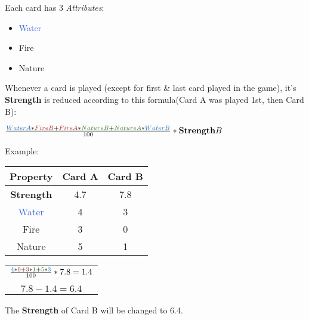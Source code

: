 \documentclass{article}
\begin{document}
    \begin{flushleft}
        Each card has 3 \textit{Attributes}: 
    \end{flushleft}
    
    \begin{itemize}
        \item \textcolor{RoyalBlue}{Water}
        \item \textcolor{BrickRed}{Fire}
        \item \textcolor{OliveGreen}{Nature}
    \end{itemize}
    
    \begin{flushleft}
        Whenever a card is played (except for first \& last card played in the game), it's \textbf{Strength} is reduced according to this formula(Card A was played 1st, then Card B):
    \end{flushleft}
    
    \begin{center}
        $\frac{\textcolor{RoyalBlue}{Water A} * \textcolor{BrickRed}{Fire B} + \textcolor{BrickRed}{Fire A} * \textcolor{OliveGreen}{Nature B} + 
        \textcolor{OliveGreen}{Nature A} * \textcolor{RoyalBlue}{Water B}}{100}*\textbf{Strength} B$
    \end{center}
    
    \begin{flushleft}
        Example: 
    \end{flushleft}
    
    \begin{center}
    \begin{tabular}{|c|c|c|}
    \hline
        Property & Card A & Card B  \\
    \hline
        \textbf{Strength} & 4.7 & 7.8 \\
    \hline
        \textcolor{RoyalBlue}{Water} & 4 & 3 \\
    \hline
        \textcolor{BrickRed}{Fire} & 3 & 0 \\
    \hline
        \textcolor{OliveGreen}{Nature} & 5 & 1 \\
    \hline
    \end{tabular}
    \begin{tabular}{c}
    $\frac{\textcolor{RoyalBlue}{4} * \textcolor{BrickRed}{0} + \textcolor{BrickRed}{3} * \textcolor{OliveGreen}{1} + 
    \textcolor{OliveGreen}{5} * \textcolor{RoyalBlue}{3}}{100}*7.8 = 1.4$\\ \\ $7.8 - 1.4 = 6.4$
    \end{tabular}
    \end{center}
    \begin{flushleft}
    The \textbf{Strength} of Card B will be changed to 6.4.
    \end{flushleft}
   
\end{document}
